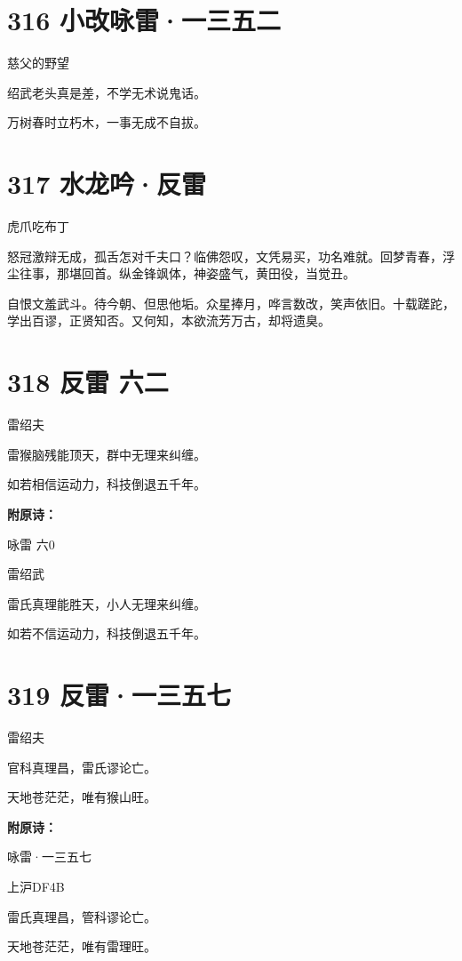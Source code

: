 \documentclass[UTF8,12pt,oneside]{ctexbook}
\def\pau#1{\begin{center} {#1} \end{center}} %
\def\poem#1#2{\section{#1}\pau{#2}} %
\begin{document}
        \poem{316 小改咏雷·一三五二}{慈父的野望}
        \begin{center}
            绍武老头真是差，不学无术说鬼话。

            万树春时立朽木，一事无成不自拔。
        \end{center}

        \newpage

        \poem{317 水龙吟·反雷}{虎爪吃布丁}

        怒冠激辩无成，孤舌怎对千夫口？临佛怨叹，文凭易买，功名难就。回梦青春，浮尘往事，那堪回首。纵金锋飒体，神姿盛气，黄田役，当觉丑。

        自恨文羞武斗。待今朝、但思他垢。众星捧月，哗言数改，笑声依旧。十载蹉跎，学出百谬，正贤知否。又何知，本欲流芳万古，却将遗臭。

        \poem{318 反雷 六二}{雷绍夫}
        \begin{center}
            雷猴脑残能顶天，群中无理来纠缠。
        
            如若相信运动力，科技倒退五千年。
        \end{center}

        \noindent \textbf{附原诗：}
        \begin{center}
        \heiti \Large 咏雷 六0
        \end{center}
        \begin{center}
            雷绍武
        \end{center}

        \begin{center}
            雷氏真理能胜天，小人无理来纠缠。

            如若不信运动力，科技倒退五千年。
        \end{center}

        \poem{319 反雷·一三五七}{雷绍夫}
        \begin{center}
            官科真理昌，雷氏谬论亡。

            天地苍茫茫，唯有猴山旺。
        \end{center}

        \noindent \textbf{附原诗：}
        \begin{center}
        \heiti \Large 咏雷·一三五七
        \end{center}
        \begin{center}
            上沪DF4B
        \end{center}

        \begin{center}
            雷氏真理昌，管科谬论亡。
            
            天地苍茫茫，唯有雷理旺。
        \end{center}
\end{document}
